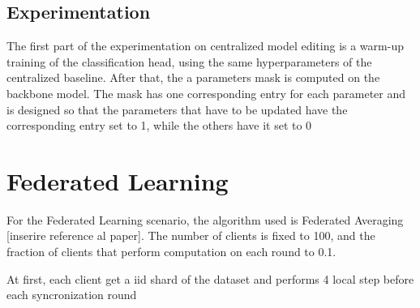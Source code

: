 \documentclass[10pt,twocolumn,letterpaper]{article}
\begin{document}
\subsection{Experimentation}

The first part of the experimentation on centralized model editing is a warm-up training of the classification head, using the same hyperparameters of the centralized baseline. After that, the a parameters mask is computed on the backbone model. The mask has one corresponding entry for each parameter and is designed so that the parameters that have to be updated have the corresponding entry set to 1, while the others have it set to 0




\section{Federated Learning}

For the Federated Learning scenario, the algorithm used is Federated Averaging [inserire reference al paper]. The number of clients is fixed to 100, and the fraction of clients that perform computation on each round to 0.1.

At first, each client get a iid shard of the dataset and performs 4 local step before each syncronization round
\end{document}
